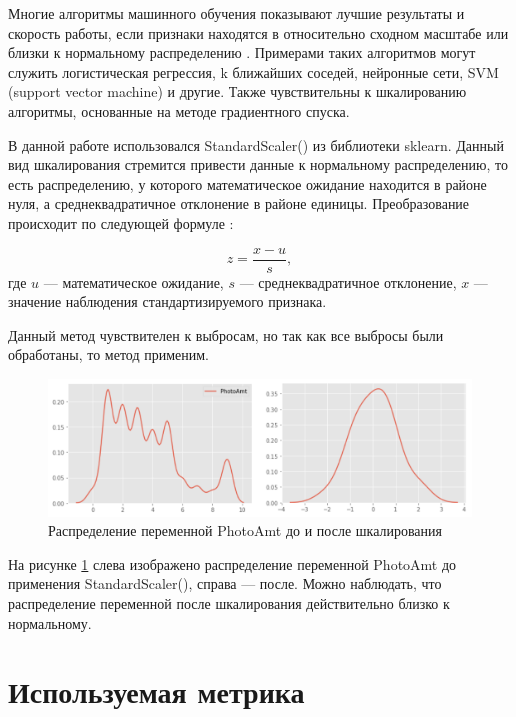 \documentclass[14pt]{mmcs_article}
\begin{document}
Многие алгоритмы машинного обучения показывают лучшие результаты и скорость работы, если признаки находятся в относительно сходном масштабе или близки к нормальному распределению \cite{lib:standardize}.  Примерами таких алгоритмов могут служить логистическая регрессия, k ближайших соседей, нейронные сети, SVM (support vector machine) и другие. Также чувствительны к шкалированию алгоритмы, основанные на методе градиентного спуска.

В данной работе использовался StandardScaler() из библиотеки sklearn. Данный вид шкалирования стремится привести данные к нормальному распределению, то есть распределению, у которого математическое ожидание находится в районе нуля, а среднеквадратичное отклонение в районе единицы. Преобразование происходит по следующей формуле \cite{lib:sklearnstandard}:

\begin{equation}\label{eq:1}
	z = \frac{x-u}{s},
\end{equation}
где $u$ --- математическое ожидание, $s$ --- среднеквадратичное отклонение, $x$ --- значение наблюдения стандартизируемого признака.

Данный метод чувствителен к выбросам, но так как все выбросы были обработаны, то метод применим.

\begin{figure}[H]
	\centering
	\includegraphics[scale=0.4]{photoamt.png}
	\caption{Распределение переменной PhotoAmt до и после шкалирования}\label{analyse:photoamt}
\end{figure}

На рисунке \ref{analyse:photoamt} слева изображено распределение переменной PhotoAmt до применения StandardScaler(), справа --- после. Можно наблюдать, что распределение переменной после шкалирования действительно близко к нормальному.

\newpage
\section{Используемая метрика}
\end{document}

